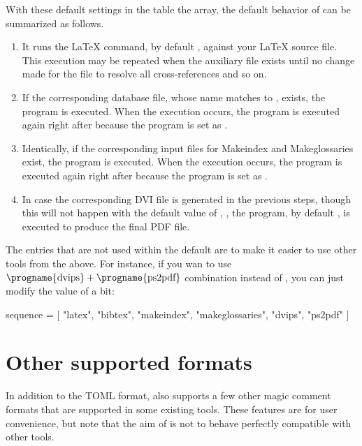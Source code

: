 \documentclass{llmk-doc}
\begin{document}
With these default settings in the  table the 
array, the default behavior of  can be summarized as follows.
%
\begin{enumerate}
\item It runs the {\LaTeX} command, by default {\LuaLaTeX}, against your
  {\LaTeX} source file. This execution may be repeated when the auxiliary file
  exists until no change made for the file to resolve all cross-references and
  so on.
\item If the corresponding {\BibTeX} database file, whose name matches to
  , exists, the {\BibTeX} program is executed. When the execution
  occurs, the  program is executed again right after because
  the program is set as .
\item Identically, if the corresponding input files for Makeindex and
  Makeglossaries exist, the program is executed. When the execution occurs,
  the  program is executed again right after because the
  program is set as .
\item In case the corresponding DVI file is generated in the previous steps,
  though this will not happen with the default value of , \ie
  , the  program, by default ,
  is executed to produce the final PDF file.
\end{enumerate}

The entries that are not used within the default  are to make it
easier to use other tools from the above. For instance, if you wan to use
$\text{\progname{dvips}}+\text{\progname{ps2pdf}}$ combination instead of
, you can just modify the value of  a bit:
%
\begin{htcode}
sequence = [
  "latex", "bibtex", "makeindex", "makeglossaries", "dvips", "ps2pdf"
]
\end{htcode}

\section{Other supported formats}
\label{sec:magic-comment}

In addition to the TOML format,  also supports a few other magic
comment formats that are supported in some existing tools. These features are
for user convenience, but note that the aim of  is not to behave
perfectly compatible with other tools.
\end{document}
